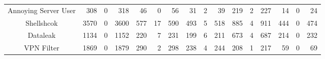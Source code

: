 \begin{table*}[t]
{\begin{tabular}{c|rrr|rrr|rrr|rrr|rrr}
Annoying Server User & 308                                         & 0                                           & 318                                       & 46                                          & 0                                           & 56                                        & 31                                          & 2                                           & 39                                        & 219                                         & 2                                           & 227                                       & 14                                          & 0                                           & 24                                       \\
Shellshcok           & 3570                                        & 0                                           & 3600                                      & 577                                         & 17                                          & 590                                       & 493                                         & 5                                           & 518                                       & 885                                         & 4                                           & 911                                       & 444                                         & 0                                           & 474                                      \\
Dataleak             & 1134                                        & 0                                           & 1152                                      & 220                                         & 7                                           & 231                                       & 199                                         & 6                                           & 211                                       & 673                                         & 4                                           & 687                                       & 214                                         & 0                                           & 232                                      \\
VPN Filter           & 1869                                        & 0                                           & 1879                                      & 290                                         & 2                                           & 298                                       & 238                                         & 4                                           & 244                                       & 208                                         & 1                                           & 217                                       & 59                                          & 0                                           & 69                                       \\

\end{tabular}}
\end{table*}
